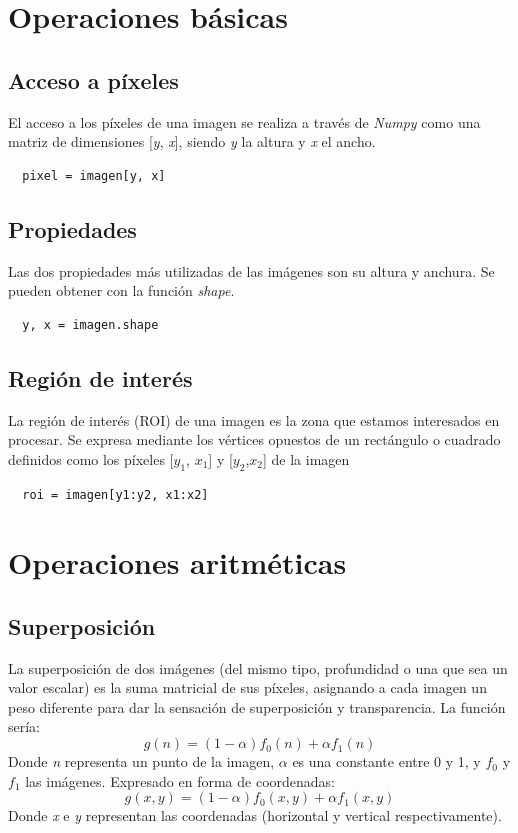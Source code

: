\section{Operaciones básicas}
\subsection{Acceso a píxeles}
El acceso a los píxeles de una imagen se realiza a través de
\emph{Numpy} como una matriz de dimensiones [\emph{y}, \emph{x}],
siendo \emph{y} la altura y \emph{x} el ancho.
\begin{verbatim}
  pixel = imagen[y, x]
\end{verbatim}

\subsection{Propiedades}
Las dos propiedades más utilizadas de las imágenes son su altura y
anchura.  Se pueden obtener con la función \emph{shape}.
\begin{verbatim}
  y, x = imagen.shape
\end{verbatim}

\subsection{Región de interés}
La región de interés (ROI) de una imagen es la zona que estamos
interesados en procesar. Se expresa mediante los vértices opuestos de
un rectángulo o cuadrado definidos como los píxeles [$y_1$, $x_1$] y
[$y_2$,$x_2$] de la imagen
\begin{verbatim}
  roi = imagen[y1:y2, x1:x2]
\end{verbatim}

\section{Operaciones aritméticas}
\subsection{Superposición}
La superposición de dos imágenes (del mismo tipo, profundidad o una
que sea un valor escalar) es la suma matricial de sus píxeles,
asignando a cada imagen un peso diferente para dar la sensación de
superposición y transparencia. La función sería:
\begin{equation*}
  g(n) = (1 - \alpha)f_0(n) + \alpha f_1(n)
\end{equation*}
Donde \emph{n} representa un punto de la imagen, \emph{$\alpha$} es una
constante entre 0 y 1, y \emph{$f_0$} y \emph{$f_1$} las imágenes.
Expresado en forma de coordenadas:
\begin{equation*}
  g(x, y) = (1 - \alpha)f_0(x, y) + \alpha f_1(x, y)
\end{equation*}
Donde \emph{x} e \emph{y} representan las coordenadas (horizontal y
vertical respectivamente).


